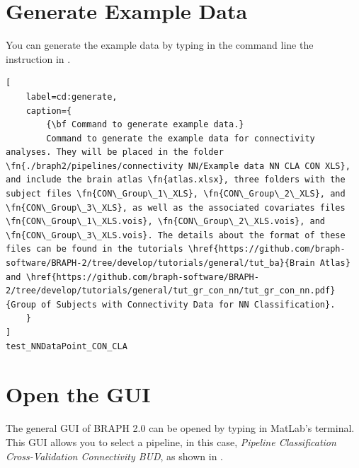 \documentclass[justified]{tufte-handout}
\begin{document}
	{
	
\tableofcontents

\clearpage
\section{Generate Example Data}

You can generate the example data by typing in the command line the instruction in .
%
\begin{lstlisting}[
	label=cd:generate,
	caption={
		{\bf Command to generate example data.}
		Command to generate the example data for connectivity analyses. They will be placed in the folder \fn{./braph2/pipelines/connectivity NN/Example data NN CLA CON XLS}, and include the brain atlas \fn{atlas.xlsx}, three folders with the subject files \fn{CON\_Group\_1\_XLS}, \fn{CON\_Group\_2\_XLS}, and \fn{CON\_Group\_3\_XLS}, as well as the associated covariates files \fn{CON\_Group\_1\_XLS.vois}, \fn{CON\_Group\_2\_XLS.vois}, and \fn{CON\_Group\_3\_XLS.vois}. The details about the format of these files can be found in the tutorials \href{https://github.com/braph-software/BRAPH-2/tree/develop/tutorials/general/tut_ba}{Brain Atlas} and \href{https://github.com/braph-software/BRAPH-2/tree/develop/tutorials/general/tut_gr_con_nn/tut_gr_con_nn.pdf}{Group of Subjects with Connectivity Data for NN Classification}.
	}
]
test_NNDataPoint_CON_CLA
\end{lstlisting}

\section{Open the GUI}

The general GUI of BRAPH 2.0 can be opened by typing  in MatLab's terminal. This GUI allows you to select a pipeline, in this case, \emph{Pipeline Classification Cross-Validation Connectivity BUD}, as shown in .

}
\end{document}
